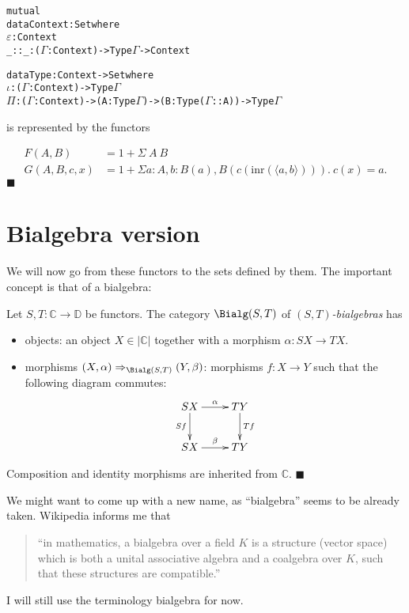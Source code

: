 \documentclass{article}
\begin{document}
\begin{example} \mbox{}

\begin{alltt}
mutual
  data Context : Set where
       \(\varepsilon\) : Context
    _::_ : (\(\Gamma\) : Context) -> Type \(\Gamma\) -> Context

  data Type : Context -> Set where
    \(\iota\)  : (\(\Gamma\) : Context) -> Type \(\Gamma\)
    \(\Pi\) : (\(\Gamma\) : Context) -> (A : Type \(\Gamma\)) -> (B : Type (\(\Gamma\) :: A)) -> Type \(\Gamma\)
\end{alltt}
is represented by the functors

\begin{align*}
  F(A, B) &= 1 + \Sigma\ A\ B \\
  G(A, B, c, x) &= 1 + \Sigma a : A, b : B(a), B(c (\text{inr}(\langle a, b\rangle))).\ c(x) = a.
\end{align*}
\hfill $\blacksquare$
\end{example}



\section{Bialgebra version} \label{nottingham}


We will now go from these functors to the sets defined by them. The
important concept is that of a bialgebra:

\begin{definition}
  Let $S, T : \mathbb{C} \to \mathbb{D}$ be functors. The category $\Bialg(S, T)$ of
  \emph{$(S, T)$-bialgebras} has
  \begin{itemize}
  \item objects: an object $X \in |\mathbb{C}|$ together with a morphism $\alpha : SX \to TX$.
  \item morphisms $(X, \alpha) \Rightarrow_{\Bialg(S, T)} (Y, \beta)$: morphisms $f : X \to Y$ such that the following diagram commutes:
\[
\xymatrix{
SX \ar^-{\alpha}[r] \ar_-{Sf}[d] & TY \ar^-{Tf}[d] \\
SX \ar^-{\beta}[r] & TY \\
}
\]
  \end{itemize}
  Composition and identity morphisms are inherited from $\mathbb{C}$.
\hfill $\blacksquare$
\end{definition}

\begin{remark} We might want to come up with a new name, as
``bialgebra'' seems to be already taken. Wikipedia informs me that
\begin{quote}
  ``in mathematics, a bialgebra over a field $K$ is a structure (vector
  space) which is both a unital associative algebra and a coalgebra
  over $K$, such that these structures are compatible.''
\end{quote}
I will still use the terminology bialgebra for now.
\end{remark}
\end{document}
